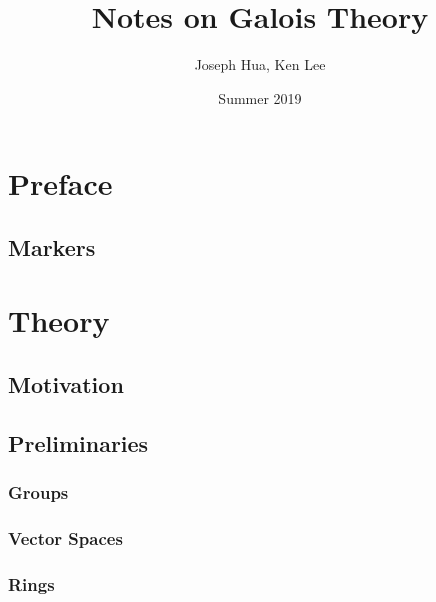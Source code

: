 \documentclass[oneside]{book}
\theoremstyle{lemmastyle}
\theoremstyle{definitionstyle}
\theoremstyle{exercisestyle}
\theoremstyle{claimstyle}
\newcommand{\<}{\langle}
\renewcommand{\>}{\rangle}
\begin{document}
\title{Notes on Galois Theory}
\author{Joseph Hua, Ken Lee}
\date{Summer 2019}
\maketitle

\tableofcontents
\newpage

\part{Preface}
    \chapter{Markers}
        

\part{Theory}
    
    \chapter{Motivation}
        
        
    \chapter{Preliminaries}
        
        \section{Groups}
            
        
        \section{Vector Spaces}
            
        
        \section{Rings}
            
        
\end{document}
